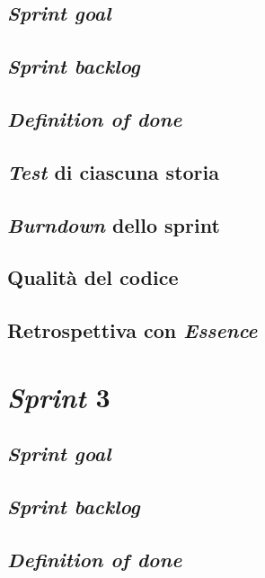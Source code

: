 \documentclass{article}
\begin{document}
\subsection{\emph{Sprint goal}}

\subsection{\emph{Sprint backlog}}

\subsection{\emph{Definition of done}}

\subsection{\emph{Test} di ciascuna storia}

\subsection{\emph{Burndown} dello sprint}

\subsection{Qualità del codice}

\subsection{Retrospettiva con \emph{Essence}}

\section{\emph{Sprint} 3}

\subsection{\emph{Sprint goal}}

\subsection{\emph{Sprint backlog}}

\subsection{\emph{Definition of done}}
\end{document}
